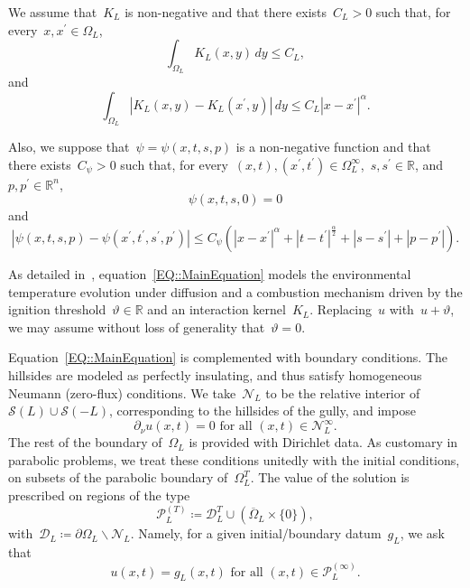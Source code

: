 \documentclass[12pt,a4paper]{amsart}
\numberwithin{equation}{section}
\theoremstyle{definition}
\theoremstyle{remark}
\newcommand{\R}{\mathbb{R}}
\newcommand{\abs}[1]{\left\lvert#1\right\rvert}
\renewcommand{\leq}{\leqslant}
\begin{document}
We assume that~$K_L$ is non-negative and that there exists~$C_L > 0$ such that, for every~$x,x^\prime \in \Omega_L$,
\begin{equation}\label{EQ::KernelAssumptionL1}
    \int_{\Omega_L} K_L(x,y)\,dy \leq C_L,
\end{equation}
and
\begin{equation}\label{EQ::KernelAssumptionHolder}
    \int_{\Omega_L} \abs{K_L(x,y) - K_L(x^\prime, y)}\, dy \leq C_L \abs{x-x^\prime}^\alpha.
\end{equation}

Also, we suppose that~$\psi = \psi(x,t,s,p)$ is a non-negative function and that there exists~$C_\psi >0$ such that, for every~$(x,t),(x^\prime,t^\prime) \in \Omega_L^\infty$,~$s,s^\prime \in \R$, and~$p,p^\prime \in \R^n$,
\begin{equation}\label{EQ::psiAssumptionZero}
    \psi(x,t,s,0) = 0
\end{equation}
and
\begin{equation}\label{EQ::psiAssumptionLipschitz}
    \left|\psi(x,t,s,p) - \psi(x^\prime, t^\prime, s^\prime, p^\prime)\right| \leq C_\psi \left(\abs{x-x^\prime}^{\alpha} + \abs{t-t^\prime}^{\frac{\alpha}{2}} + \abs{s-s^\prime} + \abs{p-p^\prime}\right).
\end{equation}

As detailed in~\cite{MR4772545}, equation~\eqref{EQ::MainEquation} models the environmental temperature evolution under diffusion and a combustion mechanism driven by the ignition threshold~$\vartheta\in\R$ and an interaction kernel~$K_L$. Replacing~$u$ with~$u+\vartheta$, we may assume without loss of generality that~$\vartheta=0$.

Equation~\eqref{EQ::MainEquation} is complemented with boundary conditions. The hillsides are modeled as perfectly insulating, and thus satisfy homogeneous Neumann (zero-flux) conditions. We take~$\mathcal{N}_L$ to be the relative interior of~$\mathcal{S}(L)\cup\mathcal{S}(-L)$, corresponding to the hillsides of the gully, and impose
\begin{equation}\label{EQ::MainNeumann}
    \partial_\nu u(x,t) = 0\text{ for all }(x,t) \in \mathcal{N}_L^\infty.
\end{equation}
The rest of the boundary of~$\Omega_L$ is provided with Dirichlet data. As customary in parabolic problems, we treat these conditions unitedly with the initial conditions, on subsets of the parabolic boundary of~$\Omega_L^T$. The value of the solution is prescribed on regions of the type
\begin{equation}
    \mathcal{P}_L^{(T)} \coloneq \mathcal{D}_L^T \cup \left(\overline{\Omega}_L \times \{0\}\right), %
\end{equation}
with~$\mathcal{D}_L \coloneq \partial\Omega_L \smallsetminus \mathcal{N}_L$. Namely, for a given initial/boundary datum~$g_L$, we ask that
\begin{equation}\label{EQ::MainDirichlet}
    u(x,t) = g_L(x,t) \text{ for all } (x,t) \in \mathcal{P}_L^{(\infty)}.
\end{equation}
\end{document}
